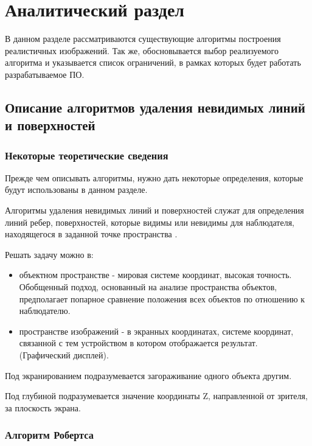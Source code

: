 \chapter{Аналитический раздел}

    В данном разделе рассматриваются существующие алгоритмы построения реалистичных изображений. Так же, обосновывается выбор реализуемого алгоритма и указывается список ограничений, в рамках которых будет работать разрабатываемое ПО.
    
    \section{Описание алгоритмов удаления невидимых линий и поверхностей}

        \subsection {Некоторые теоретические сведения}
        
            Прежде чем описывать алгоритмы, нужно дать некоторые определения, которые будут использованы в данном разделе.
            
            Алгоритмы удаления невидимых линий и поверхностей служат для определения линий ребер, поверхностей, которые видимы или невидимы для наблюдателя, находящегося в заданной точке пространства \cite{rogers}.
            
            Решать задачу можно в:
            \begin{itemize}
            	\item объектном пространстве - мировая системе координат, высокая точность. Обобщенный подход, основанный на анализе пространства объектов, предполагает попарное сравнение положения всех объектов по отношению к наблюдателю.
            	\item пространстве изображений - в экранных координатах, системе координат, связанной с тем устройством в котором отображается результат. (Графический дисплей).
            \end{itemize}
            
            Под экранированием подразумевается загораживание одного объекта другим.
            
            Под глубиной подразумевается значение координаты Z, направленной от зрителя, за плоскость экрана.
        
        \subsection{Алгоритм Робертса}
        

